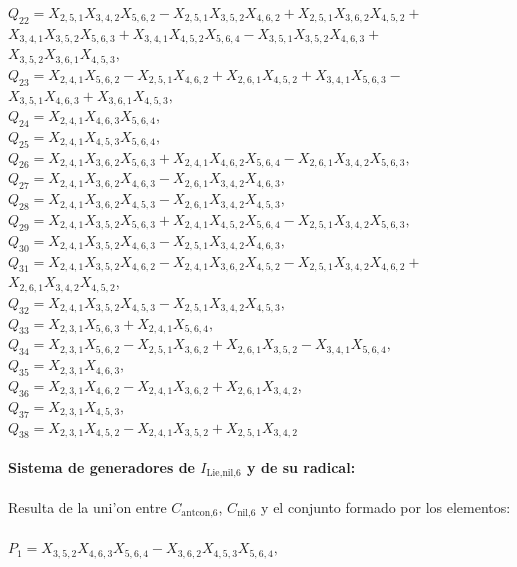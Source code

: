 \documentclass[10pt]{beamer}
\begin{document}
{$Q_{22}=X_{2,5,1}X_{3,4,2}X_{5,6,2}-X_{2,5,1}X_{3,5,2}X_{4,6,2}+X_{2,5,1}X_{3,6,2}X_{4,5,2}+$\\
$X_{3,4,1}X_{3,5,2}X_{5,6,3}+X_{3,4,1}X_{4,5,2}X_{5,6,4}-X_{3,5,1}X_{3,5,2}X_{4,6,3}+$\\
$X_{3,5,2}X_{3,6,1}X_{4,5,3},$\\
$Q_{23}=X_{2,4,1}X_{5,6,2}-X_{2,5,1}X_{4,6,2}+X_{2,6,1}X_{4,5,2}+X_{3,4,1}X_{5,6,3}-$\\
$X_{3,5,1}X_{4,6,3}+X_{3,6,1}X_{4,5,3},$\\
$Q_{24}=X_{2,4,1}X_{4,6,3}X_{5,6,4},$\\
$Q_{25}=X_{2,4,1}X_{4,5,3}X_{5,6,4},$\\
$Q_{26}=X_{2,4,1}X_{3,6,2}X_{5,6,3}+X_{2,4,1}X_{4,6,2}X_{5,6,4}-X_{2,6,1}X_{3,4,2}X_{5,6,3},$\\
$Q_{27}=X_{2,4,1}X_{3,6,2}X_{4,6,3}-X_{2,6,1}X_{3,4,2}X_{4,6,3},$\\
$Q_{28}=X_{2,4,1}X_{3,6,2}X_{4,5,3}-X_{2,6,1}X_{3,4,2}X_{4,5,3},$\\
$Q_{29}=X_{2,4,1}X_{3,5,2}X_{5,6,3}+X_{2,4,1}X_{4,5,2}X_{5,6,4}-X_{2,5,1}X_{3,4,2}X_{5,6,3},$\\
$Q_{30}=X_{2,4,1}X_{3,5,2}X_{4,6,3}-X_{2,5,1}X_{3,4,2}X_{4,6,3},$\\
$Q_{31}=X_{2,4,1}X_{3,5,2}X_{4,6,2}-X_{2,4,1}X_{3,6,2}X_{4,5,2}-X_{2,5,1}X_{3,4,2}X_{4,6,2}+$\\
$X_{2,6,1}X_{3,4,2}X_{4,5,2},$\\
$Q_{32}=X_{2,4,1}X_{3,5,2}X_{4,5,3}-X_{2,5,1}X_{3,4,2}X_{4,5,3},$\\
$Q_{33}=X_{2,3,1}X_{5,6,3}+X_{2,4,1}X_{5,6,4},$\\
$Q_{34}=X_{2,3,1}X_{5,6,2}-X_{2,5,1}X_{3,6,2}+X_{2,6,1}X_{3,5,2}-X_{3,4,1}X_{5,6,4},$\\
$Q_{35}=X_{2,3,1}X_{4,6,3},$\\
$Q_{36}=X_{2,3,1}X_{4,6,2}-X_{2,4,1}X_{3,6,2}+X_{2,6,1}X_{3,4,2},$\\
$Q_{37}=X_{2,3,1}X_{4,5,3},$\\
$Q_{38}=X_{2,3,1}X_{4,5,2}-X_{2,4,1}X_{3,5,2}+X_{2,5,1}X_{3,4,2}$\\
\\
\textbf{Sistema de generadores de $I_{\text{Lie,nil,}6}$ y de su radical:}\\
\\
Resulta de la uni'on entre $C_{\text{antcon,}6}$, $C_{\text{nil,}6}$ y el conjunto formado por los elementos:\\
\\
$P_{1}=X_{3,5,2}X_{4,6,3}X_{5,6,4}-X_{3,6,2}X_{4,5,3}X_{5,6,4},$\\
}
\end{document}
